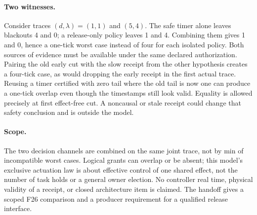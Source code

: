 \documentclass[11pt]{article}
\begin{document}
\paragraph{Two witnesses.}
Consider traces $(d,\lambda)=(1,1)$ and $(5,4)$.
The safe timer alone leaves blackouts 4 and 0; a release-only
policy leaves 1 and 4. Combining them gives 1 and 0, hence
a one-tick worst case instead of four for each isolated policy.
Both sources of evidence must be available under the same declared
authorization. Pairing the old early cut with the slow receipt
from the other hypothesis creates a four-tick case, as would
dropping the early receipt in the first actual trace. Reusing a
timer certified with zero tail where the old tail is now one
can produce a one-tick overlap even though the timestamps still
look valid. Equality is allowed precisely at first effect-free
cut. A noncausal or stale receipt could change that safety
conclusion and is outside the model.

\paragraph{Scope.}
The two decision channels are combined on the same joint trace,
not by min of incompatible worst cases. Logical grants can
overlap or be absent; this model's exclusive actuation law
is about effective control of one shared effect, not the number
of task holds or a general owner election. No controller real
time, physical validity of a receipt, or closed architecture item
is claimed. The handoff gives a scoped F26 comparison and a
producer requirement for a qualified release interface.
\end{document}
